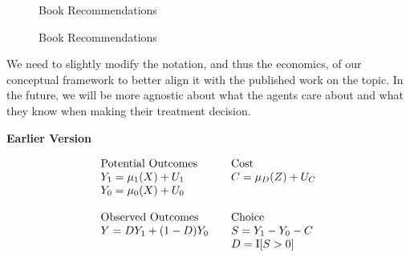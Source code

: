 \begin{frame}
\begin{figure}
\caption{Book Recommendations}
\hspace{0.5cm}
\end{figure}
\end{frame}


\begin{frame}
\begin{figure}
\caption{Book Recommendations}
\hspace{0.5cm}
\end{figure}
\end{frame}


\begin{frame}
We need to slightly modify the notation, and thus the economics, of our conceptual framework to better align it with the published work on the topic. In the future, we will be more agnostic about what the agents care about and what they know when making their treatment decision.
\end{frame}

\begin{frame}
\textbf{Earlier Version}

\begin{align*}\begin{array}{l@{\qquad}l}
\text{Potential Outcomes} & \text{Cost} \\
Y_1 = \mu_1(X) + U_1      &C = \mu_D(Z) + U_C \\
Y_0 = \mu_0(X) + U_0      & \\
    & \\
\text{Observed Outcomes } & \text{Choice} \\
Y = D Y_1 + (1 - D)Y_0 & S = Y_1 - Y_0 - C \\
                       & D = \mathrm{I}[S > 0] \\
\end{array}\end{align*}
\end{frame}


